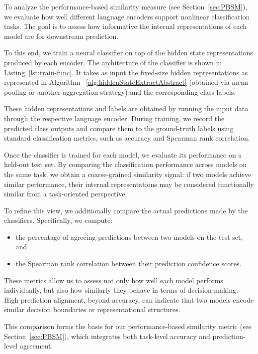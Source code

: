 To analyze the performance-based similarity measure (see Section~\ref{sec:PBSM}), we evaluate how well different language encoders support nonlinear classification tasks. 
The goal is to assess how informative the internal representations of each model are for downstream prediction.

To this end, we train a neural classifier on top of the hidden state representations produced by each encoder. 
The architecture of the classifier is shown in Listing~\ref{lst:train-func}.
It takes as input the fixed-size hidden representations as represented in Algorithm ~\ref{alg:hiddenStateExtractAbstract} (obtained via mean pooling or another aggregation strategy) and the corresponding class labels.

These hidden representations and labels are obtained by running the input data through the respective language encoder. 
During training, we record the predicted class outputs and compare them to the ground-truth labels using standard classification metrics, such as accuracy and Spearman rank correlation.

Once the classifier is trained for each model, we evaluate its performance on a held-out test set.
By comparing the classification performance across models on the same task, we obtain a coarse-grained similarity signal: if two models achieve similar performance, their internal representations may be considered functionally similar from a task-oriented perspective.

To refine this view, we additionally compare the actual predictions made by the classifiers.
Specifically, we compute:
\begin{itemize}
    \item the percentage of agreeing predictions between two models on the test set, and
    \item the Spearman rank correlation between their prediction confidence scores.
\end{itemize}

These metrics allow us to assess not only how well each model performs individually, but also how similarly they behave in terms of decision-making. 
High prediction alignment, beyond accuracy, can indicate that two models encode similar decision boundaries or representational structures.

This comparison forms the basis for our performance-based similarity metric (see Section~\ref{sec:PBSM}), which integrates both task-level accuracy and prediction-level agreement.
